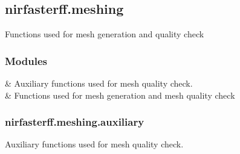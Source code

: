 \documentclass[letterpaper,10pt,english]{sphinxmanual}
\begin{document}
\subsection{nirfasterff.meshing}
\label{\detokenize{_autosummary/nirfasterff.meshing:module-nirfasterff.meshing}}\label{\detokenize{_autosummary/nirfasterff.meshing:nirfasterff-meshing}}\label{\detokenize{_autosummary/nirfasterff.meshing::doc}}
\sphinxAtStartPar
Functions used for mesh generation and quality check
\subsubsection*{Modules}


\begin{savenotes}\sphinxattablestart
\sphinxthistablewithglobalstyle
\sphinxthistablewithnovlinesstyle
\centering
\begin{tabulary}{\linewidth}[t]{}
\sphinxtoprule
\sphinxtableatstartofbodyhook
\sphinxAtStartPar
{\hyperref[\detokenize{_autosummary/nirfasterff.meshing.auxiliary:module-nirfasterff.meshing.auxiliary}]{}}
&
\sphinxAtStartPar
Auxiliary functions used for mesh quality check.
\\
\sphinxhline
\sphinxAtStartPar
{\hyperref[\detokenize{_autosummary/nirfasterff.meshing.meshutils:module-nirfasterff.meshing.meshutils}]{}}
&
\sphinxAtStartPar
Functions used for mesh generation and mesh quality check
\\
\sphinxbottomrule
\end{tabulary}
\sphinxtableafterendhook\par
\sphinxattableend\end{savenotes}

\sphinxstepscope


\subsubsection{nirfasterff.meshing.auxiliary}
\label{\detokenize{_autosummary/nirfasterff.meshing.auxiliary:module-nirfasterff.meshing.auxiliary}}\label{\detokenize{_autosummary/nirfasterff.meshing.auxiliary:nirfasterff-meshing-auxiliary}}\label{\detokenize{_autosummary/nirfasterff.meshing.auxiliary::doc}}
\sphinxAtStartPar
Auxiliary functions used for mesh quality check.
\end{document}
